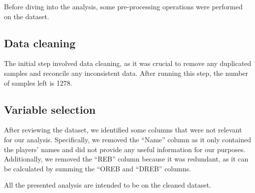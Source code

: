 Before diving into the analysis, some pre-processing operations were performed on the dataset.

\subsection{Data cleaning}
The initial step involved data cleaning, as it was crucial to remove any duplicated samples and reconcile any inconsistent data.
After running this step, the number of samples left is 1278.

\subsection{Variable selection}
After reviewing the dataset, we identified some columns that were not relevant for our analysis. Specifically, we removed the ``Name'' column as it only contained the players' names and did not provide any useful information for our purposes. Additionally, we removed the ``REB'' column because it was redundant, as it can be calculated by summing the ``OREB and ``DREB'' columns.

\noindent
All the presented analysis are intended to be on the cleaned dataset.

